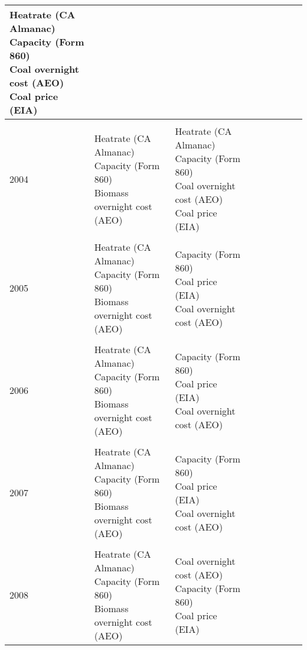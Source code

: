 \documentclass[10pt]{report}
\begin{document}
\begin{scriptsize}
\begin{landscape}
\begin{center}
\begin{longtable}{|lllllllll|}
\shortstack{Heatrate (CA Almanac) \\ Capacity (Form 860) \\ Coal overnight cost (AEO) \\ Coal price (EIA)} & \\
\hline \\
2004 & \shortstack{Heatrate (CA Almanac) \\Capacity (Form 860) \\ Biomass overnight cost (AEO)}  &
\shortstack{Heatrate (CA Almanac) \\ Capacity (Form 860) \\ Coal overnight cost (AEO) \\ Coal price (EIA)} & \\
\hline \\
2005 & \shortstack{Heatrate (CA Almanac) \\ Capacity (Form 860) \\ Biomass overnight cost (AEO)}  &
\shortstack{Capacity (Form 860) \\ Coal price (EIA) \\ Coal overnight cost (AEO)} & \\
\hline \\
2006 & \shortstack{Heatrate (CA Almanac) \\ Capacity (Form 860) \\ Biomass overnight cost (AEO)} &
\shortstack{Capacity (Form 860) \\ Coal price (EIA) \\ Coal overnight cost (AEO)} & \\
\hline \\
2007 & \shortstack{Heatrate (CA Almanac) \\ Capacity (Form 860) \\ Biomass overnight cost (AEO)} &
\shortstack{Capacity (Form 860) \\ Coal price (EIA) \\ Coal overnight cost (AEO)} & \\
\hline \\
2008 & \shortstack{Heatrate (CA Almanac) \\ Capacity (Form 860) \\ Biomass overnight cost (AEO)} &
\shortstack{Coal overnight cost (AEO) \\ Capacity (Form 860) \\ Coal price (EIA)} & \\

\end{longtable}
\end{center}
\end{landscape}
\end{scriptsize}
\end{document}
